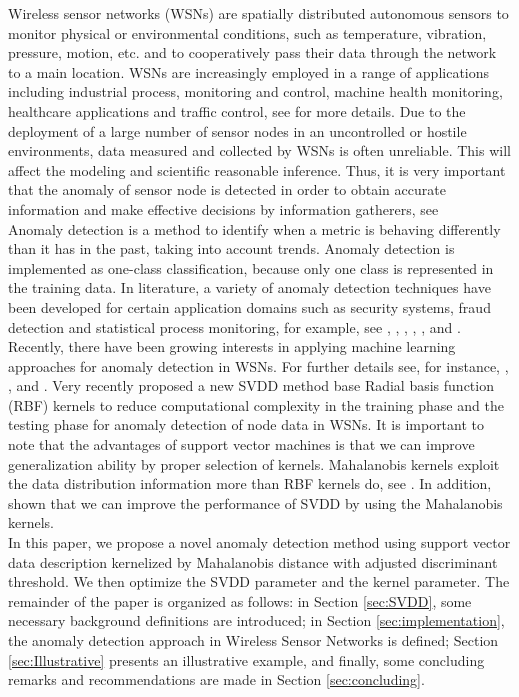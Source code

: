 \documentclass[conference]{IEEEtran}
\theoremstyle{problemstyle}
\begin{document}
Wireless sensor networks (WSNs) are spatially distributed autonomous sensors to monitor physical or environmental conditions, such as temperature, vibration, pressure, motion, etc. and to cooperatively pass their data through the network to a main location. WSNs are increasingly employed in a range of applications including industrial process, monitoring and control, machine health monitoring, healthcare applications and traffic control, see \cite{Xie2011} for more details. Due to the deployment of a large number of sensor nodes in an uncontrolled or hostile environments, data measured and collected by WSNs is often  unreliable. This will affect the modeling and scientific reasonable inference. Thus, it is very important that the anomaly of sensor node is detected in order to obtain accurate information and make effective decisions by information gatherers, see \cite{sharma2010sensor}\\

Anomaly detection is a method to identify when a metric is behaving differently than it has in the past, taking into account trends. Anomaly detection is implemented as one-class classification, because only one class is represented in the training data. In literature, a variety of anomaly detection techniques have been developed for certain application domains such as security systems, fraud detection and statistical process monitoring, for example, see \cite{ilonen2006gaussian}, \cite{clifton2011novelty}, \cite{Tran2015a}, \cite{Tran2015b}, \cite{Chandola2016}, \cite{Tran2016} and \cite{Tran2016c}. Recently, there have been growing interests in applying machine learning approaches for anomaly detection in WSNs. For further details see, for instance, \cite{sharma2010sensor}, \cite{Xie2011}, \cite{Rajasegarar2014} and \cite{Chandola2016}. Very recently \cite{feng2017new} proposed a new SVDD method base Radial basis function (RBF) kernels to reduce computational complexity in the training phase and the testing phase for anomaly detection of node data in WSNs. It is important to note that the advantages of support vector machines is that we can improve generalization ability by proper selection of kernels. Mahalanobis kernels exploit the data distribution information
more than RBF kernels do, see \cite{abe2005training}. In addition, \cite{maboudou2016monitoring} shown that we can improve the performance of SVDD by using the Mahalanobis kernels.\\

In this paper, we propose a novel anomaly detection method using support vector data description kernelized by Mahalanobis distance with adjusted discriminant threshold. We then optimize the SVDD parameter and the kernel parameter. The remainder of the paper is
organized as follows: in Section \ref{sec:SVDD}, some necessary background definitions are introduced; in Section \ref{sec:implementation}, the anomaly detection approach in Wireless Sensor Networks is defined; Section \ref{sec:Illustrative} presents an illustrative example, and finally, some concluding remarks and recommendations are made in Section \ref{sec:concluding}.
\end{document}
